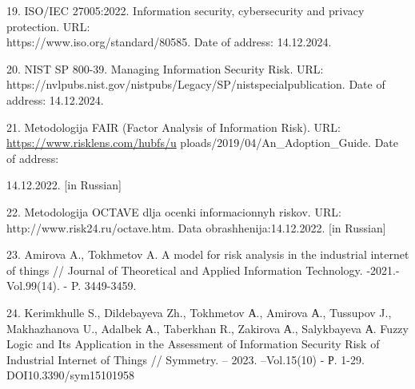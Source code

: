 \begin{references}
19. ISO/IEC 27005:2022. Information security, cybersecurity and privacy
protection. URL: \\https://www.iso.org/standard/80585. Date of address:
14.12.2024.

20. NIST SP 800-39. Managing Information Security Risk. URL:\\
https://nvlpubs.nist.gov/nistpubs/Legacy/SP/nistspecialpublication. Date
of address: 14.12.2024.

21. Metodologija FAIR (Factor Analysis of Information Risk). URL:
\url{https://www.risklens.com/hubfs/u}
ploads/2019/04/An\_Adoption\_Guide. Date of address:

14.12.2022. {[}in Russian{]}

22. Metodologija OCTAVE dlja ocenki informacionnyh riskov. URL:
http://www.risk24.ru/octave.htm. Data obrashhenija:14.12.2022. {[}in
Russian{]}

23. Amirova A., Tokhmetov A. A model for risk analysis in the industrial
internet of things // Journal of Theoretical and Applied Information
Technology. -2021.- Vol.99(14). - P. 3449-3459.

24. Kerimkhulle S., Dildebayeva Zh., Tokhmetov А., Amirova А., Tussupov
J., Makhazhanova U., Adalbek А., Taberkhan R., Zakirova А., Salykbayeva
А. Fuzzy Logic and Its Application in the Assessment of Information
Security Risk of Industrial Internet of Things // Symmetry. -- 2023.
--Vol.15(10) - Р. 1-29. DOI10.3390/sym15101958
\end{references}

